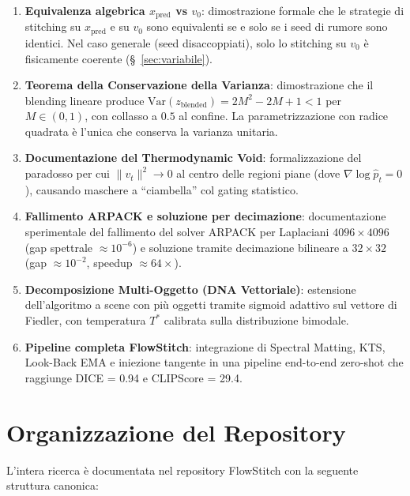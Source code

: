 \documentclass[12pt,a4paper]{report}
\begin{document}
\begin{enumerate}
    \item \textbf{Equivalenza algebrica $x_{\text{pred}}$ vs $v_0$}: dimostrazione formale che le strategie di stitching su $x_{\text{pred}}$ e su $v_0$ sono equivalenti se e solo se i seed di rumore sono identici. Nel caso generale (seed disaccoppiati), solo lo stitching su $v_0$ è fisicamente coerente (\S~\ref{sec:variabile}).

    \item \textbf{Teorema della Conservazione della Varianza}: dimostrazione che il blending lineare produce $\text{Var}(z_{\text{blended}}) = 2M^2 - 2M + 1 < 1$ per $M \in (0,1)$, con collasso a $0.5$ al confine. La parametrizzazione con radice quadrata è l'unica che conserva la varianza unitaria.

    \item \textbf{Documentazione del Thermodynamic Void}: formalizzazione del paradosso per cui $\|v_t\|^2 \to 0$ al centro delle regioni piane (dove $\nabla \log \hat{p}_t = 0$), causando maschere a ``ciambella'' col gating statistico.

    \item \textbf{Fallimento ARPACK e soluzione per decimazione}: documentazione sperimentale del fallimento del solver ARPACK per Laplaciani $4096 \times 4096$ (gap spettrale $\approx 10^{-6}$) e soluzione tramite decimazione bilineare a $32 \times 32$ (gap $\approx 10^{-2}$, speedup $\approx 64\times$).

    \item \textbf{Decomposizione Multi-Oggetto (DNA Vettoriale)}: estensione dell'algoritmo a scene con più oggetti tramite sigmoid adattivo sul vettore di Fiedler, con temperatura $T^*$ calibrata sulla distribuzione bimodale.

    \item \textbf{Pipeline completa FlowStitch}: integrazione di Spectral Matting, KTS, Look-Back EMA e iniezione tangente in una pipeline end-to-end zero-shot che raggiunge DICE = 0.94 e CLIPScore = 29.4.
\end{enumerate}

\section{Organizzazione del Repository}

L'intera ricerca è documentata nel repository FlowStitch con la seguente struttura canonica:
\end{document}

